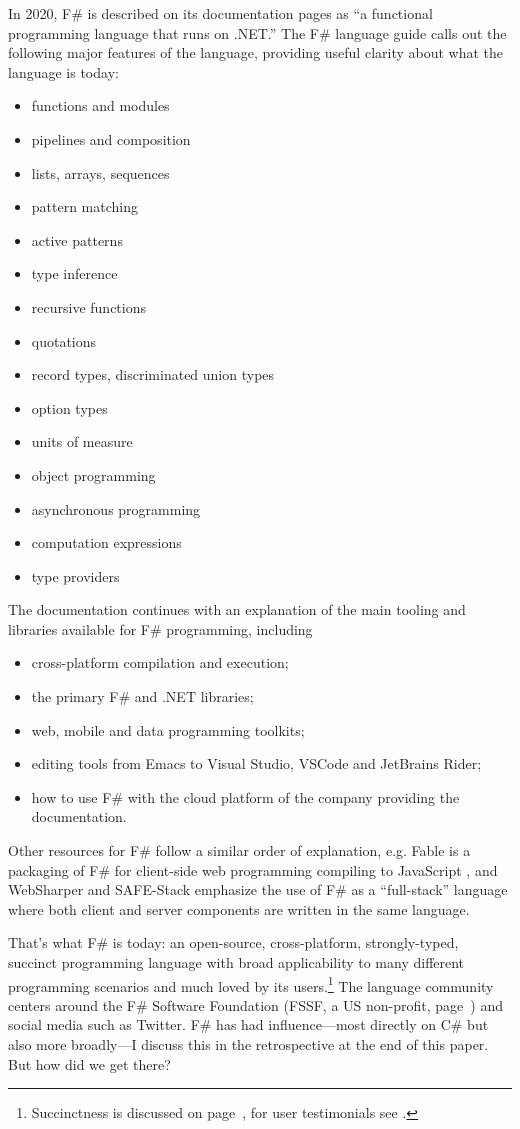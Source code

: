 \documentclass[acmsmall]{acmart}\settopmatter{}
\begin{document}
In 2020, F\# is described on its documentation pages as “a functional programming language that runs on .NET.” The F\# language guide \citep{WhatIsFSharp2020} calls out the following major features of the language, providing useful clarity about what the language is today:
\begin{itemize}
\item functions and modules
\item pipelines and composition
\item lists, arrays, sequences
\item pattern matching 
\item active patterns 
\item type inference
\item recursive functions
\item quotations
\item record types, discriminated union types
\item option types
\item units of measure
\item object programming
\item asynchronous programming
\item computation expressions
\item type providers
\end{itemize}
The documentation continues with an explanation of the main tooling and libraries available for F\# programming, including
\begin{itemize}
\item cross-platform compilation and execution;
\item the primary F\# and .NET libraries;
\item web, mobile and data programming toolkits;
\item editing tools from Emacs to Visual Studio, VSCode and JetBrains Rider;
\item how to use F\# with the cloud platform of the company providing the documentation.
\end{itemize}
Other resources for F\# follow a similar order of explanation, e.g. Fable  is a packaging of F\# for client-side web
programming compiling to JavaScript \citep{GarciaCaro2018}, and
WebSharper \citep{Granicz2020} and SAFE-Stack \citep{Abraham2020} emphasize
the use of F\# as a “full-stack” language where both client and server components are written in the
same language.


That's what F\# is today: an open-source, cross-platform, strongly-typed, succinct programming language with broad applicability
to many different programming scenarios and much loved by its
users.\footnote{Succinctness is discussed on page~\pageref{page:fsharp-succinct}, for user testimonials see \citep{FSharpTestimonials}.}  The language community centers around
the F\# Software Foundation (FSSF, a US non-profit, page~\pageref{page:community}) and social media such as Twitter. F\# has had influence---most
directly on C\# but also more broadly---I discuss this in the retrospective at the end of this paper.  But how did we get there?
\end{document}
